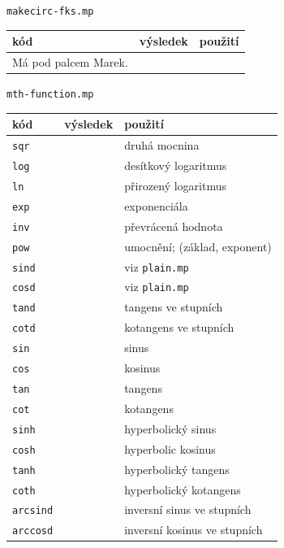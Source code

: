 \documentclass[a4paper,10pt]{article}
\begin{document}
{\centering\large\texttt{makecirc-fks.mp}\nopagebreak\\\medskip}
\begin{tabularx}{\textwidth}{|l|l|X|}\hline
    kód & výsledek & použití\\\hline
    Má pod palcem Marek.&&\\\hline
\end{tabularx}\bigskip

{\centering\large\texttt{mth-function.mp}\nopagebreak\\\medskip}
\begin{tabularx}{\textwidth}{|l|l|X|}\hline
    kód & výsledek & použití\\\hline
    \verb+sqr+  && druhá mocnina\\\hline
    \verb+log+  && desítkový logaritmus\\\hline
    \verb+ln+   && přirozený logaritmus\\\hline
    \verb+exp+  && exponenciála\\\hline
    \verb+inv+  && převrácená hodnota\\\hline
    \verb+pow+  && umocnění; (základ, exponent)\\\hline
    \hline
    \verb+sind+ && viz {\tt plain.mp}\\\hline
    \verb+cosd+ && viz {\tt plain.mp}\\\hline
    \verb+tand+ && tangens ve stupních\\\hline
    \verb+cotd+ && kotangens ve stupních\\\hline
    \verb+sin+  && sinus\\\hline
    \verb+cos+  && kosinus\\\hline
    \verb+tan+  && tangens\\\hline
    \verb+cot+  && kotangens\\\hline
    \hline
    \verb+sinh+ && hyperbolický sinus\\\hline
    \verb+cosh+ && hyperbolic kosinus\\\hline
    \verb+tanh+ && hyperbolický tangens\\\hline
    \verb+coth+ && hyperbolický kotangens\\\hline
    \hline
    \verb+arcsind+ && inversní sinus ve stupních\\\hline
    \verb+arccosd+ && inversní kosinus ve stupních\\\hline

\end{tabularx}
\end{document}
